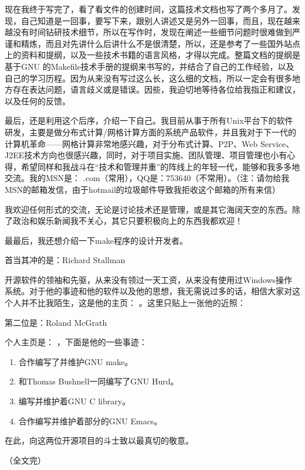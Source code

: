 \documentclass[a4paper,10pt]{sphinxmanual}
\begin{document}
现在我终于写完了，看了看文件的创建时间，这篇技术文档也写了两个多月了。发现，自己知道是一回事，要写下来，跟别人讲述又是另外一回事，而且，现在越来越没有时间钻研技术细节，所以在写作时，发现在阐述一些细节问题时很难做到严谨和精炼，而且对先讲什么后讲什么不是很清楚，所以，还是参考了一些国外站点上的资料和提纲，以及一些技术书籍的语言风格，才得以完成。整篇文档的提纲是基于GNU
的Makefile技术手册的提纲来书写的，并结合了自己的工作经验，以及自己的学习历程。因为从来没有写过这么长，这么细的文档，所以一定会有很多地方存在表达问题，语言歧义或是错误。因些，我迫切地等待各位给我指正和建议，以及任何的反馈。

最后，还是利用这个后序，介绍一下自己。我目前从事于所有Unix平台下的软件研发，主要是做分布式计算/网格计算方面的系统产品软件，并且我对于下一代的计算机革命——网格计算非常地感兴趣，对于分布式计算、P2P、Web Service、J2EE技术方向也很感兴趣，同时，对于项目实施、团队管理、项目管理也小有心得，希望同样和我战斗在“技术和管理并重”的阵线上的年轻一代，能够和我多多地交流。我的MSN是：
.com（常用），QQ是：753640（不常用）。（注：请勿给我MSN的邮箱发信，由于hotmail的垃圾邮件导致我拒收这个邮箱的所有来信）

我欢迎任何形式的交流，无论是讨论技术还是管理，或是其它海阔天空的东西。除了政治和娱乐新闻我不关心，其它只要积极向上的东西我都欢迎！

最最后，我还想介绍一下make程序的设计开发者。

首当其冲的是：Richard Stallman

开源软件的领袖和先驱，从来没有领过一天工资，从来没有使用过Windows操作系统。对于他的事迹和他的软件以及他的思想，我无需说过多的话，相信大家对这个人并不比我陌生，这是他的主页： 。这里只贴上一张他的近照：


第二位是：Roland McGrath

个人主页是： ，下面是他的一些事迹：
\begin{enumerate}
\def\theenumi{\arabic{enumi}}
\def\labelenumi{\theenumi .}
\makeatletter\def\p@enumii{\p@enumi \theenumi .}\makeatother
\item {} 
合作编写了并维护GNU make。

\item {} 
和Thomas Bushnell一同编写了GNU Hurd。

\item {} 
编写并维护着GNU C library。

\item {} 
合作编写并维护着部分的GNU Emacs。

\end{enumerate}

在此，向这两位开源项目的斗士致以最真切的敬意。

（全文完）



\renewcommand{\indexname}{索引}
\printindex
\end{document}
